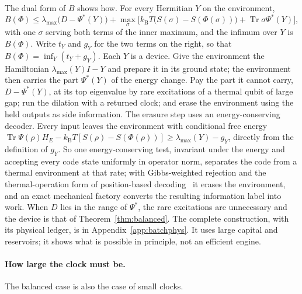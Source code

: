 \documentclass[11pt]{article}
\theoremstyle{definition}
\theoremstyle{remark}
\newcommand{\Tr}{\operatorname{Tr}}
\newcommand{\kB}{k_{\mathrm B}}
\begin{document}
The dual form of $B$ shows how. For every Hermitian $Y$ on the environment,
\[
B(\Phi)\le\lambda_{\max}\bigl(D-\Psi^*(Y)\bigr)+\max_\sigma\bigl[\kB T\bigl(S(\sigma)-S(\Phi(\sigma))\bigr)+\Tr\sigma\Psi^*(Y)\bigr],
\]
with one $\sigma$ serving both terms of the inner maximum, and the infimum over $Y$ is $B(\Phi)$. Write $t_Y$ and $g_Y$ for the two terms on the right, so that $B(\Phi)=\inf_Y(t_Y+g_Y)$. Each $Y$ is a device. Give the environment the Hamiltonian $\lambda_{\max}(Y)I-Y$ and prepare it in its ground state; the environment then carries the part $\Psi^*(Y)$ of the energy change. Pay the part it cannot carry, $D-\Psi^*(Y)$, at its top eigenvalue by rare excitations of a thermal qubit of large gap; run the dilation with a returned clock; and erase the environment using the held outputs as side information. The erasure step uses an energy-conserving decoder. Every input leaves the environment with conditional free energy $\Tr\Psi(\rho)H_E-\kB T[S(\rho)-S(\Phi(\rho))]\ge\lambda_{\max}(Y)-g_Y$, directly from the definition of $g_Y$. So one energy-conserving test, invariant under the energy and accepting every code state uniformly in operator norm, separates the code from a thermal environment at that rate; with Gibbs-weighted rejection and the thermal-operation form of position-based decoding~\cite{AnshuJainWarsi19,FBB21} it erases the environment, and an exact mechanical factory converts the resulting information label into work. When $D$ lies in the range of $\Psi^*$, the rare excitations are unnecessary and the device is that of Theorem~\ref{thm:balanced}. The complete construction, with its physical ledger, is in Appendix~\ref{app:batchphys}. It uses large capital and reservoirs; it shows what is possible in principle, not an efficient engine.

\paragraph{How large the clock must be.} The balanced case is also the case of small clocks.
\end{document}
